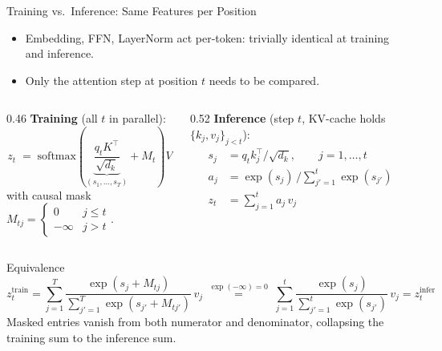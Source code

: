 \begin{frame}{Training vs.\ Inference: Same Features per Position}
  \begin{itemize}
    \item Embedding, FFN, LayerNorm act per-token: trivially identical at training and inference.
    \item Only the attention step at position $t$ needs to be compared.
  \end{itemize}

  \begin{columns}[T]
    \begin{column}{0.46\textwidth}
      \textbf{Training} (all $t$ in parallel):
      \[
        z_t \;=\; \mathrm{softmax}\!\left(\underbrace{\frac{q_t K^\top}{\sqrt{d_k}}}_{(s_1, \ldots, s_T)} + M_t\right) V
      \]
      with causal mask
      $M_{tj} = \begin{cases} 0 & j \le t \\ -\infty & j > t \end{cases}$.
    \end{column}
    \begin{column}{0.52\textwidth}
      \textbf{Inference} (step $t$, KV-cache holds $\{k_j, v_j\}_{j<t}$):
      \begin{align*}
        s_j &= q_t k_j^\top / \sqrt{d_k}, \qquad j = 1, \ldots, t \\[-1pt]
        a_j &= \exp(s_j) \,\Big/ \!\!\sum_{j'=1}^{t}\! \exp(s_{j'}) \\[-1pt]
        z_t &= \sum_{j=1}^{t} a_j\, v_j
      \end{align*}
    \end{column}
  \end{columns}

  \vspace{0.4em}
  \begin{block}{Equivalence}
    \vspace{-0.6em}
    \[
      z_t^{\mathrm{train}}
      = \sum_{j=1}^{T} \frac{\exp(s_j + M_{tj})}{\sum_{j'=1}^{T} \exp(s_{j'} + M_{tj'})}\, v_j
      \;\stackrel{\exp(-\infty)=0}{=}\;
      \sum_{j=1}^{t} \frac{\exp(s_j)}{\sum_{j'=1}^{t} \exp(s_{j'})}\, v_j
      = z_t^{\mathrm{infer}}
    \]
    Masked entries vanish from both numerator and denominator, collapsing the training sum to the inference sum.
  \end{block}
\end{frame}

